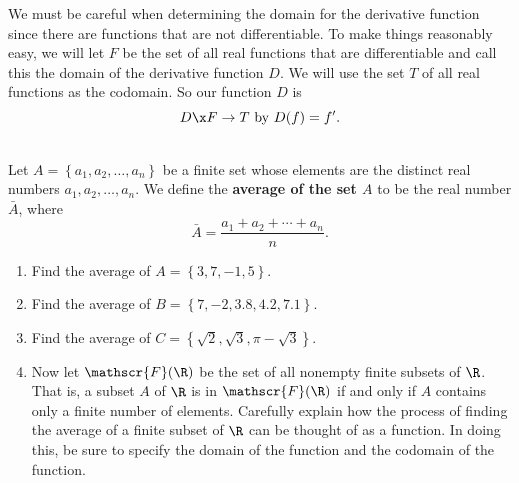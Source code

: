 %
We must be careful when determining the domain for the derivative function since there are functions that are not differentiable.  To make things reasonably easy, we will let  $F$  be the set of all real functions that are differentiable and call this the domain of the derivative function  $D$.  We will use the set  $T$ of all real functions as the codomain.  So our function  $D$  is
\[
D\x F \to T  \text{ by } D( f ) = f'.
\]
%
\begin{prog}\label{pr:average} \hfill \\
%
Let $A = \left\{ a_1, a_2, \ldots, a_n \right\}$ be a finite set whose elements are the distinct real numbers $a_1, a_2, \ldots, a_n$.  We define the \textbf{average of the set $A$} to be the real number $\bar{A}$, where
\[
\bar{A} = \frac{a_1 + a_2 + \cdots + a_n}{n}.
\]
\begin{enumerate}
\item Find the average of $A = \left\{ 3, 7, -1, 5 \right\}$.
\item Find the average of $B = \left\{ 7, -2, 3.8, 4.2, 7.1 \right\}$.
\item Find the average of $C = \left\{ \sqrt{2}, \sqrt{3}, \pi - \sqrt{3} \right\}$.
\item Now let $\mathscr{F}( \R )$ be the set of all nonempty finite subsets of $\R$.  That is, a subset $A$ of $\R$ is in $\mathscr{F}( \R )$ if and only if $A$ contains only a finite number of elements.  Carefully explain how the process of finding the average of a finite subset of $\R$ can be thought of as a function.  In doing this, be sure to specify the domain of the function and the codomain of the function.
\end{enumerate}
\end{prog}
\hbreak

\endinput
